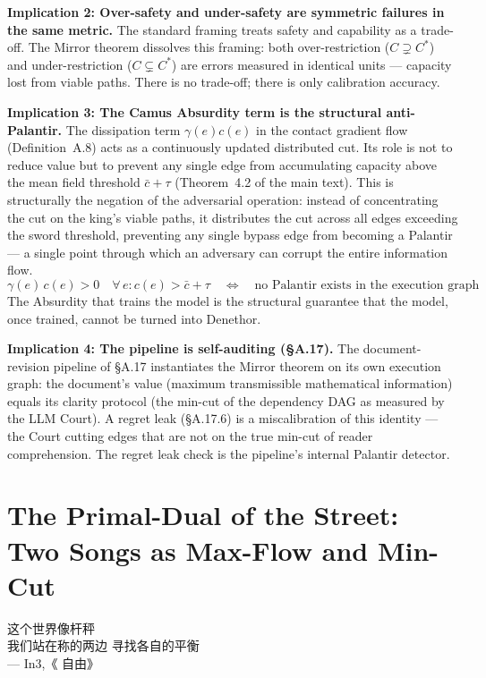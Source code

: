 \documentclass[11pt,a4paper]{article}
\theoremstyle{definition}
\theoremstyle{remark}
\begin{document}
\textbf{Implication 2: Over-safety and under-safety are symmetric failures in the same metric.} The standard framing treats safety and capability as a trade-off. The Mirror theorem dissolves this framing: both over-restriction ($C \supsetneq C^*$) and under-restriction ($C \subsetneq C^*$) are errors measured in identical units --- capacity lost from viable paths. There is no trade-off; there is only calibration accuracy.

\textbf{Implication 3: The Camus Absurdity term is the structural anti-Palantir.} The dissipation term $\gamma(e) c(e)$ in the contact gradient flow (Definition~A.8) acts as a continuously updated distributed cut. Its role is not to reduce value but to prevent any single edge from accumulating capacity above the mean field threshold $\bar{c} + \tau$ (Theorem~4.2 of the main text). This is structurally the negation of the adversarial operation: instead of concentrating the cut on the king's viable paths, it distributes the cut across all edges exceeding the sword threshold, preventing any single bypass edge from becoming a Palantir --- a single point through which an adversary can corrupt the entire information flow.
\[
  \gamma(e)\, c(e) > 0 \quad \forall\, e : c(e) > \bar{c} + \tau \quad \Longleftrightarrow \quad \text{no Palantir exists in the execution graph}
\]
The Absurdity that trains the model is the structural guarantee that the model, once trained, cannot be turned into Denethor.

\textbf{Implication 4: The pipeline is self-auditing (\S A.17).} The document-revision pipeline of \S A.17 instantiates the Mirror theorem on its own execution graph: the document's value (maximum transmissible mathematical information) equals its clarity protocol (the min-cut of the dependency DAG as measured by the LLM Court). A regret leak (\S A.17.6) is a miscalibration of this identity --- the Court cutting edges that are not on the true min-cut of reader comprehension. The regret leak check is the pipeline's internal Palantir detector.

\section{The Primal-Dual of the Street: Two Songs as Max-Flow and Min-Cut}

\begin{center}
{\color{red!70!black} 这个世界像杆秤}\\
{\color{yellow!70!black} 我们站在称的两边} {\color{green!60!black} 寻找各自的平衡}\\
--- In3,《{\color{red!70!black} 自由}》\cite{in3}
\end{center}
\end{document}
